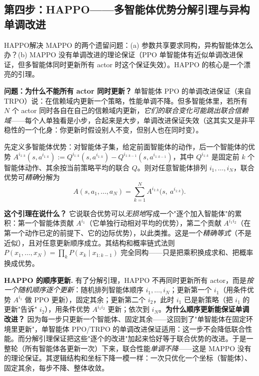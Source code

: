 \subsection{第四步：HAPPO——多智能体优势分解引理与异构单调改进}

HAPPO\cite{kuba2022happo}解决 MAPPO 的两个遗留问题：(a) 参数共享要求同构，异构智能体怎么办？(b) MAPPO 没有单调改进的理论保证（PPO 单智能体有近似单调改进保证，但多智能体同时更新所有 actor 时这个保证失效）。HAPPO 的核心是一个漂亮的引理。

\textbf{问题：为什么不能所有 actor 同时更新？} 单智能体 PPO 的单调改进保证（来自 TRPO）说：在信赖域内更新一个策略，性能单调不降。但多智能体里，若所有 $N$ 个 actor 同时各自在自己的信赖域内更新，\emph{它们的联合变化可能跳出联合信赖域}——每个人单独看是小步，合起来是大步，单调改进保证失效（这其实又是非平稳性的一个化身：你更新时假设别人不变，但别人也在同时变）。

\begin{theorem}[多智能体优势分解引理]\label{thm:sm-advantage-decomp}
先定义多智能体优势：对智能体子集，给定前面智能体的动作，后一个智能体的优势 $A^{i_{1:k}}(s,a^{i_{1:k}}):=Q^{i_{1:k}}(s,a^{i_{1:k}})-Q^{i_{1:k-1}}(s,a^{i_{1:k-1}})$，其中 $Q^{i_{1:k}}$ 是固定前 $k$ 个智能体动作、其余按当前策略平均的联合 $Q$。则对任意智能体排列 $i_1,\dots,i_N$，联合优势可\emph{精确}分解为
\begin{equation}
  A(s,a_1,\dots,a_N)=\sum_{k=1}^{N}A^{i_{1:k}}\big(s,\ a^{i_{1:k}}\big).
  \label{eq:sm-adv-decomp}
\end{equation}
\end{theorem}

\textbf{这个引理在说什么？} 它说联合优势可以\emph{无损地}写成一个"逐个加入智能体"的累积：第一个智能体贡献 $A^{i_1}$（它单独行动相对平均的优势），第二个贡献 $A^{i_1 i_2}$（在第一个动作已定的前提下、它的边际优势），以此类推。这是一个\emph{精确等式}（不是近似），且对任意更新顺序成立。其结构和概率链式法则 $P(x_1,\dots,x_N)=\prod_k P(x_k\mid x_{1:k-1})$ 完全同构——只是把乘积换成求和、把概率换成优势。

\textbf{HAPPO 的顺序更新.} 有了分解引理，HAPPO 不再同时更新所有 actor，而是\emph{按一个随机顺序逐个更新}：随机排列智能体顺序 $i_1,\dots,i_N$；更新第一个 $i_1$（用条件优势 $A^{i_1}$ 做 PPO 更新），固定其余；更新第二个 $i_2$，此时 $i_1$ 已是新策略（把 $i_1$ 的更新"告诉" $i_2$），用条件优势 $A^{i_1 i_2}$ 更新；依次到 $i_N$。\textbf{为什么顺序更新能保证单调改进？} 因为每一步只更新一个智能体、固定其余——这回到了"单智能体在固定环境里更新"，单智能体 PPO/TRPO 的单调改进保证适用：这一步不会降低联合性能。而分解引理保证把这些"逐个的改进"加起来恰好等于联合优势的改进。于是一整轮（所有智能体各更新一次）下来，联合性能\emph{单调不降}——这是 MAPPO 没有的理论保证。其逻辑结构和坐标下降一模一样：一次只优化一个坐标（智能体）、固定其余，每步不降、整体收敛。

